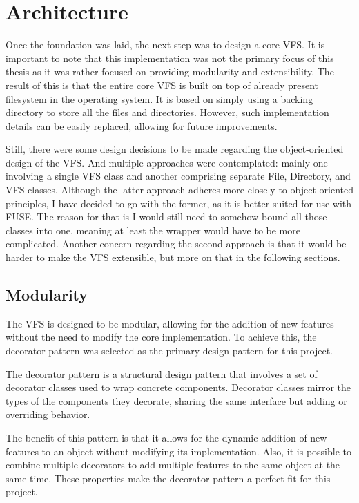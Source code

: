 \section{Architecture}\label{sec:architecture}

Once the foundation was laid, the next step was to design a core VFS.
It is important to note that this implementation was not the primary focus of this thesis as it was rather focused on providing modularity and extensibility.
The result of this is that the entire core VFS is built on top of already present filesystem in the operating system.
It is based on simply using a backing directory to store all the files and directories.
However, such implementation details can be easily replaced, allowing for future improvements.

Still, there were some design decisions to be made regarding the object-oriented design of the VFS.
And multiple approaches were contemplated: mainly one involving a single VFS class and another comprising separate File, Directory, and VFS classes.
Although the latter approach adheres more closely to object-oriented principles, I have decided to go with the former, as it is better suited for use with FUSE.
The reason for that is I would still need to somehow bound all those classes into one, meaning at least the wrapper would have to be more complicated.
Another concern regarding the second approach is that it would be harder to make the VFS extensible, but more on that in the following sections.

\subsection{Modularity}\label{subsec:modularity}

The VFS is designed to be modular, allowing for the addition of new features without the need to modify the core implementation.
To achieve this, the decorator pattern was selected as the primary design pattern for this project.

The decorator pattern is a structural design pattern that involves a set of decorator classes used to wrap concrete components.
Decorator classes mirror the types of the components they decorate, sharing the same interface but adding or overriding behavior.

The benefit of this pattern is that it allows for the dynamic addition of new features to an object without modifying its implementation.
Also, it is possible to combine multiple decorators to add multiple features to the same object at the same time.
These properties make the decorator pattern a perfect fit for this project.

